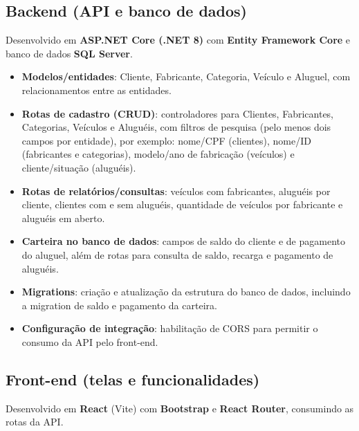 \documentclass[12pt,a4paper]{article}
\begin{document}
\subsection{Backend (API e banco de dados)}
Desenvolvido em \textbf{ASP.NET Core (.NET 8)} com \textbf{Entity Framework Core} e banco de dados \textbf{SQL Server}.

\begin{itemize}[leftmargin=*]
    \item \textbf{Modelos/entidades}: Cliente, Fabricante, Categoria, Veículo e Aluguel, com relacionamentos entre as entidades.
    \item \textbf{Rotas de cadastro (CRUD)}: controladores para Clientes, Fabricantes, Categorias, Veículos e Aluguéis, com filtros de pesquisa (pelo menos dois campos por entidade), por exemplo: nome/CPF (clientes), nome/ID (fabricantes e categorias), modelo/ano de fabricação (veículos) e cliente/situação (aluguéis).
    \item \textbf{Rotas de relatórios/consultas}: veículos com fabricantes, aluguéis por cliente, clientes com e sem aluguéis, quantidade de veículos por fabricante e aluguéis em aberto.
    \item \textbf{Carteira no banco de dados}: campos de saldo do cliente e de pagamento do aluguel, além de rotas para consulta de saldo, recarga e pagamento de aluguéis.
    \item \textbf{Migrations}: criação e atualização da estrutura do banco de dados, incluindo a migration de saldo e pagamento da carteira.
    \item \textbf{Configuração de integração}: habilitação de CORS para permitir o consumo da API pelo front-end.
\end{itemize}

\subsection{Front-end (telas e funcionalidades)}
Desenvolvido em \textbf{React} (Vite) com \textbf{Bootstrap} e \textbf{React Router}, consumindo as rotas da API.
\end{document}
